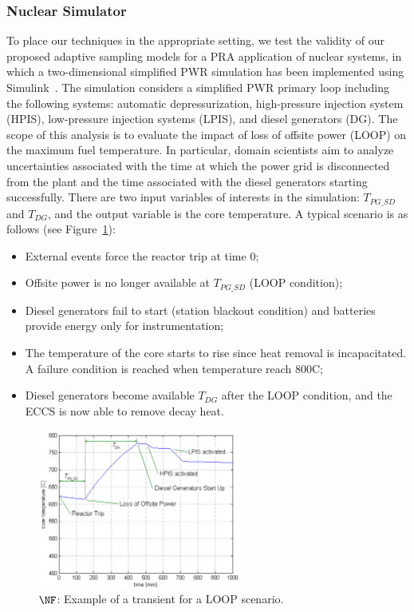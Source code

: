 
\subsubsection{Nuclear Simulator}

To place our techniques in the appropriate setting, we test the validity of our proposed adaptive sampling models for a PRA application of nuclear systems, in which a two-dimensional simplified PWR simulation has been implemented using Simulink~\cite{MandelliSmith2012}.
%
The simulation considers a simplified PWR primary loop including the following systems: automatic depressurization, high-pressure injection system (HPIS), low-pressure injection systems (LPIS), and diesel generators (DG).
%
The scope of this analysis is to evaluate the impact of loss of offsite power (LOOP) on the maximum fuel temperature.
%
In particular, domain scientists aim to analyze uncertainties associated with the time at which the power grid is disconnected from the plant and the time associated with the diesel generators starting successfully.
%
There are two input variables of interests in the simulation: $T_{PG\_SD}$ and $T_{DG}$, and the output variable is the core temperature.
%
A typical scenario is as follows (see Figure~\ref{fig:nuclearTransient}):
\begin{itemize} \denselist
  \item External events force the reactor trip at time $0$;
  \item Offsite power is no longer available at $T_{PG\_SD}$ (LOOP condition);
  \item Diesel generators fail to start (station blackout condition) and batteries provide energy only for instrumentation;
  \item The temperature of the core starts to rise since heat removal is incapacitated. A failure condition is reached when temperature reach 800C;
  \item Diesel generators become available $T_{DG}$ after the LOOP condition, and the ECCS is now able to remove decay heat.
\end{itemize}

\begin{figure}[!ht]
  \centering
  \includegraphics[width=0.6\textwidth]{figs/chap5/scenExample.pdf}
  \caption[Example of a transient for a LOOP scenario]{$\protect\NF$: Example of a transient for a LOOP scenario.}
  \label{fig:nuclearTransient}
\end{figure}

